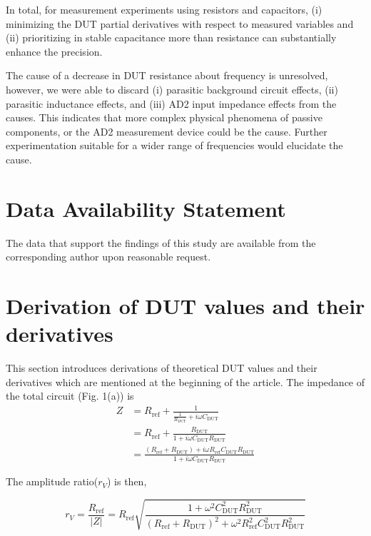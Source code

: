 \documentclass[%
 aip,
 amsmath,amssymb,
 reprint,%
]{revtex4-1}
\begin{document}
In total, for measurement experiments using resistors and capacitors, (i) minimizing the DUT partial derivatives with respect to measured variables and (ii) prioritizing in stable capacitance more than resistance can substantially enhance the precision.

The cause of a decrease in DUT resistance about frequency is unresolved, however, we were able to discard (i) parasitic background circuit effects, (ii) parasitic inductance effects, and (iii) AD2 input impedance effects from the causes. This indicates that more complex physical phenomena of passive components, or the AD2 measurement device could be the cause. Further experimentation suitable for a wider range of frequencies would elucidate the cause.

\section*{Data Availability Statement}

The data that support the findings of this study are available from the corresponding author upon reasonable request.



\appendix

\section{Derivation of DUT values and their derivatives}

This section introduces derivations of theoretical DUT values and their derivatives which are mentioned at the beginning of the article. The impedance of the total circuit (Fig. 1(a)) is
\begin{align*}
Z&=R_{\textrm{ref}}+\frac{1}{\frac{1}{R_{\textrm{DUT}}}+i\omega C_{\textrm{DUT}}}\\
&=R_{\textrm{ref}}+\frac{R_{\textrm{DUT}}}{1+i\omega C_{\textrm{DUT}}R_{\textrm{DUT}}}\\
&=\frac{(R_{\textrm{ref}}+R_{\textrm{DUT}})+i\omega R_{\textrm{ref}} C_{\textrm{DUT}}R_{\textrm{DUT}}}{1+i\omega C_{\textrm{DUT}}R_{\textrm{DUT}}}
\end{align*}

\noindent The amplitude ratio($r_V$) is then,

\begin{equation*}
r_{V}=\frac{R_{\textrm{ref}}}{|Z|}=R_{\textrm{ref}}\sqrt{\frac{1+\omega^{2}C_{\textrm{DUT}}^{2}R_{\textrm{DUT}}^{2}}{(R_{\textrm{ref}}+R_{\textrm{DUT}})^{2}+\omega^{2}R_{\textrm{ref}}^{2}C_{\textrm{DUT}}^{2}R_{\textrm{DUT}}^{2}}}
\end{equation*}
\end{document}
